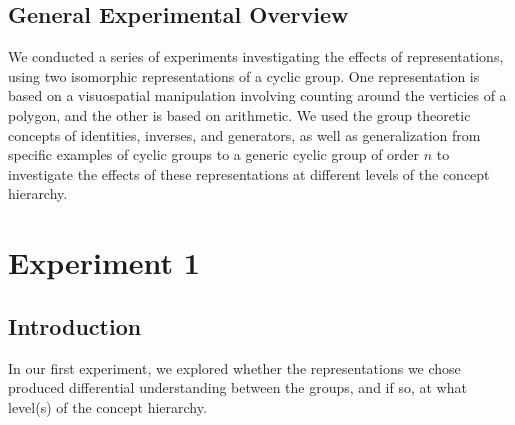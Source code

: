 \documentclass[11pt]{article}
\begin{document}
\subsection{General Experimental Overview}
We conducted a series of experiments investigating the effects of representations, using two isomorphic representations of a cyclic group. One representation is based on a visuospatial manipulation involving counting around the verticies of a polygon, and the other is based on arithmetic. We used the group theoretic concepts of identities, inverses, and generators, as well as generalization from specific examples of cyclic groups to a generic cyclic group of order $n$ to investigate the effects of these representations at different levels of the concept hierarchy. 
\section{Experiment 1}
\subsection{Introduction}
In our first experiment, we explored whether the representations we chose produced differential understanding between the groups, and if so, at what level(s) of the concept hierarchy.
\end{document}
